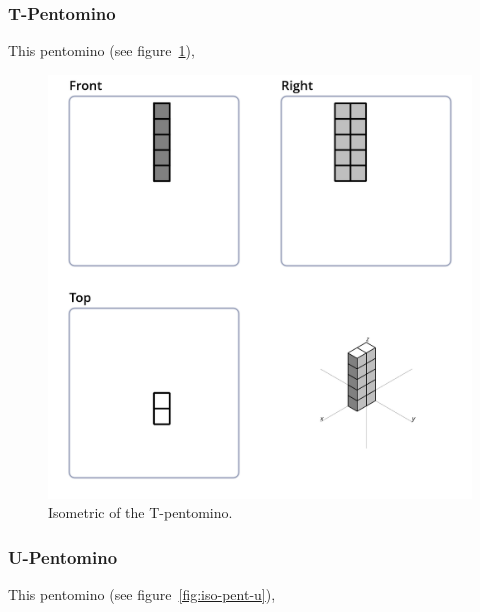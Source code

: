 \subsubsection{T-Pentomino}
\label{sec:t-pentomino}
This pentomino (see figure~\ref{fig:iso-pent-t}),


\begin{figure}
	\centering
	\includegraphics[scale=0.3]{iso_diagrams/o.png}
	\caption{Isometric of the T-pentomino.}
  \label{fig:iso-pent-t}
\end{figure}

\subsubsection{U-Pentomino}
\label{sec:u-pentomino}
This pentomino (see figure~\ref{fig:iso-pent-u}),


